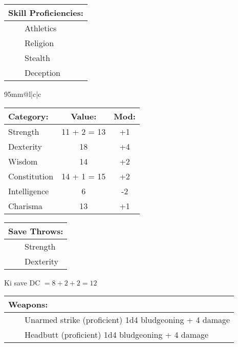 \documentclass[11pt]{article}
\newcommand{\tabitem}{~~\llap{--}~~}
\begin{document}
\begin{multicols}{2}
\vspace{2mm}

\noindent \begin{tabularx}{95mm}{@{}l}
{\Large \textbf{Skill Proficiencies:}} \\
\hline
\tabitem Athletics \\
\tabitem Religion \\
\tabitem Stealth \\
\tabitem Deception
		\end{tabularx}

\vspace{4mm}

\noindent \begin{tabularx}{95mm}{@{}l|c|c}
 \\
\hline
		\end{tabularx}
\noindent \begin{tabular}{@{}l|c|c}
\textbf{Category:} 			& \textbf{Value:} 	& \textbf{Mod:} \\
\hline
Strength 					& 11 + 2 = 13		& +1		\\
Dexterity 					& 18 				& +4		\\
Wisdom 						& 14				& +2		\\
Constitution 				& 14 + 1 = 15		& +2		\\
Intelligence 				& 6 				& -2		\\
Charisma 					& 13 				& +1
		\end{tabular}

\vspace{4mm}

\noindent \begin{tabularx}{95mm}{@{}l}
{\Large \textbf{Save Throws:}} \\
\hline
\tabitem Strength \\
\tabitem Dexterity \\
		\end{tabularx}
\noindent Ki save DC $= 8 + 2 + 2 = 12$

\vspace{4mm}

\noindent \begin{tabularx}{95mm}{@{}l}
{\Large \textbf{Weapons:}} \\
\hline
\tabitem Unarmed strike (proficient) 1d4 bludgeoning + 4 damage \\
\tabitem Headbutt (proficient) 1d4 bludgeoning + 4 damage
		\end{tabularx}


\end{multicols}
\end{document}
